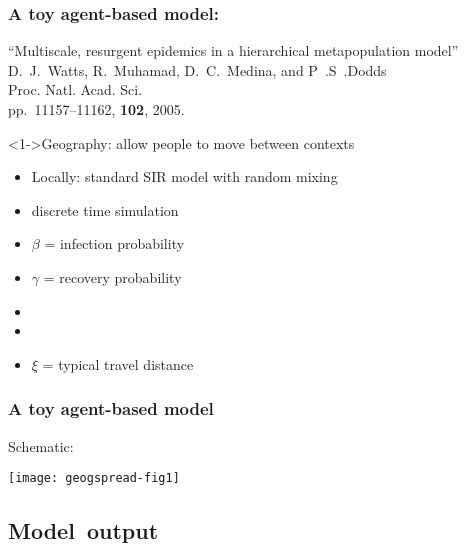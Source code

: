 




\begin{frame}
  \frametitle{A toy agent-based model:}

  \begin{block}{``Multiscale, resurgent epidemics in a hierarchical metapopulation model''}
    D.~J.~Watts, R.~Muhamad, D.~C.~Medina, and P~.S~.Dodds\\
    Proc. Natl. Acad. Sci.\\
    pp.~11157--11162, \textbf{102}, 2005.
  \end{block}
  

  \begin{block}<1->{Geography: allow people to move between contexts}
    \begin{itemize}
    \item<2->
      Locally: standard SIR model with random mixing    
    \item<3->
      discrete time simulation
    \item<4->
      $\beta$ = infection probability 
    \item<5-> 
      $\gamma$ = recovery probability
    \item<6-> 
    \item<7-> 
    \item<8-> 
       $\xi$ = typical travel distance
   \end{itemize} 
  \end{block}

\end{frame}


\begin{frame}
  \frametitle{A toy agent-based model}

  \begin{block}{Schematic:}
    \begin{center}
      \texttt{[image: geogspread-fig1]}    
    \end{center}
  \end{block}

\end{frame}

\subsection{Model\ output}

